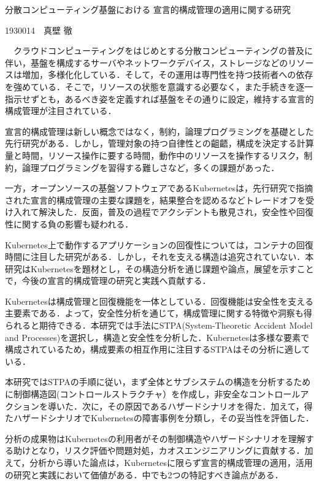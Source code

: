\documentclass[12pt,a4paper]{article}
\begin{document}
\begin{center}
分散コンピューティング基盤における 宣言的構成管理の適用に関する研究
\end{center}
\begin{flushright}
1930014~~真壁 徹
\end{flushright}
　クラウドコンピューティングをはじめとする分散コンピューティングの普及に伴い，基盤を構成するサーバやネットワークデバイス，ストレージなどのリソースは増加，多様化化している．そして，その運用は専門性を持つ技術者への依存を強めている．そこで，リソースの状態を意識する必要なく，また手続きを逐一指示せずとも，あるべき姿を定義すれば基盤をその通りに設定，維持する宣言的構成管理が注目されている．

宣言的構成管理は新しい概念ではなく，制約，論理プログラミングを基礎とした先行研究がある．しかし，管理対象の持つ自律性との齟齬，構成を決定する計算量と時間，リソース操作に要する時間，動作中のリソースを操作するリスク，制約，論理プログラミングを習得する難しさなど，多くの課題があった．

一方，オープンソースの基盤ソフトウェアであるKubernetesは，先行研究で指摘された宣言的構成管理の主要な課題を，結果整合を認めるなどトレードオフを受け入れて解決した．反面，普及の過程でアクシデントも散見され，安全性や回復性に関する負の影響も疑われる．

Kubernetes上で動作するアプリケーションの回復性については，コンテナの回復時間に注目した研究がある．しかし，それを支える構造は追究されていない．本研究はKubernetesを題材とし，その構造分析を通じ課題や論点，展望を示すことで，今後の宣言的構成管理の研究と実践へ貢献する．

Kubernetesは構成管理と回復機能を一体としている．回復機能は安全性を支える主要素である．よって，安全性分析を通じて，構成管理に関する特徴や洞察も得られると期待できる．本研究では手法にSTPA(System-Theoretic Accident Model and Processes)を選択し，構造と安全性を分析した．Kubernetesは多様な要素で構成されているため，構成要素の相互作用に注目するSTPAはその分析に適している．

本研究ではSTPAの手順に従い，まず全体とサブシステムの構造を分析するために制御構造図(コントロールストラクチャ）を作成し，非安全なコントロールアクションを導いた．次に，その原因であるハザードシナリオを得た．加えて，得たハザードシナリオでKubernetesの障害事例を分類し，その妥当性を評価した．

分析の成果物はKubernetesの利用者がその制御構造やハザードシナリオを理解する助けとなり，リスク評価や問題対処，カオスエンジニアリングに貢献する．加えて，分析から導いた論点は，Kubernetesに限らず宣言的構成管理の適用，活用の研究と実践において価値がある．中でも2つの特記すべき論点がある．
\end{document}
